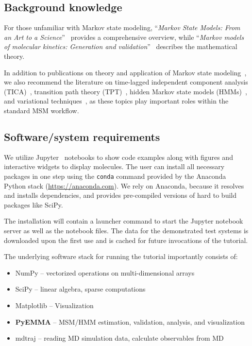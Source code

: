 \documentclass[9pt,tutorial]{livecoms}
\begin{document}
\subsection{Background knowledge}
\label{sec:background}

For those unfamiliar with Markov state modeling, ``\emph{Markov State Models: From an Art to a Science}''~\cite{msm-brooke} provides a comprehensive overview, while ``\emph{Markov models of molecular kinetics: Generation and validation}''~\cite{msm-jhp} describes the mathematical theory. 

In addition to publications on theory and application of Markov state modeling~\cite{msm-book,buchete-msm-2008,noe-tmat-sampling,bowman-msm-2009,noe-folding-pathways,sarich-msm-quality,noe-fingerprints,noe-dy-neut-scatt,Chodera2014,ben-rev-msm,simon-mech-mod-nmr,oom-feliks}, we also recommend the literature on time-lagged independent component analysis (TICA)~\cite{tica,tica3,tica2,kinetic-maps}, transition path theory (TPT)~\cite{weinan-tpt,metzner-msm-tpt}, hidden Markov state models (HMMs)~\cite{noe-proj-hid-msm,hmm-baum-welch-alg,hmm-tutorial}, and variational techniques~\cite{noe-vac,vamp-preprint,gmrq}, as these topics play important roles within the standard MSM workflow.

\subsection{Software/system requirements}

We utilize Jupyter~\cite{jupyter} notebooks to show code examples along with figures and interactive widgets to display molecules. The user can install all necessary packages in one step using the \texttt{conda} command provided by the Anaconda Python stack (\url{https://anaconda.com}). We rely on Anaconda, because it resolves and installs dependencies, and provides pre-compiled versions of hard to build packages like SciPy.

The installation will contain a launcher command to start the Jupyter notebook server as well as the notebook files. The data for the demonstrated test systems is downloaded upon the first use and is cached for future invocations of the tutorial.

The underlying software stack for running the tutorial importantly consists of:
\begin{itemize}
\item NumPy -- vectorized operations on multi-dimensional arrays~\cite{numpy}
\item SciPy -- linear algebra, sparse computations~\cite{scipy}
\item Matplotlib -- Visualization~\cite{matplotlib}
\item \textbf{PyEMMA} -- MSM/HMM estimation, validation, analysis, and visualization~\cite{pyemma}
\item mdtraj -- reading MD simulation data, calculate observables from MD~\cite{mdtraj}
\end{itemize}
\end{document}
